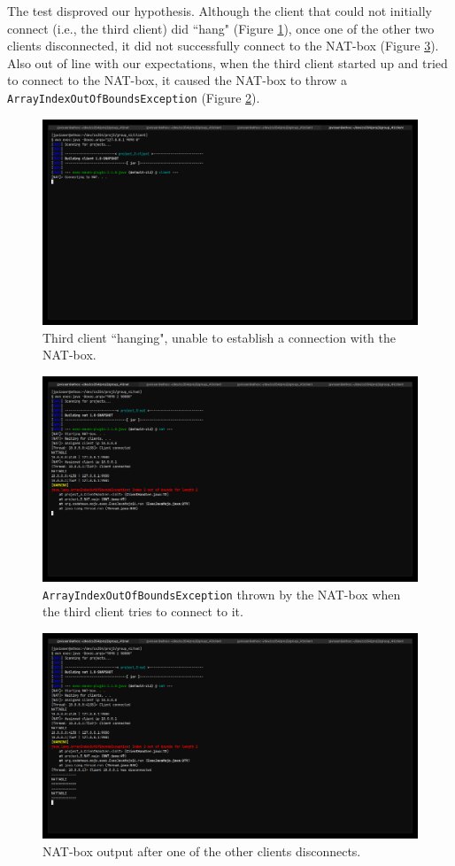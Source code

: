 \documentclass[10pt, a4paper]{article}
\begin{document}
The test disproved our hypothesis. Although the client that could not initially
connect (i.e., the third client) did ``hang" (Figure \ref{fig:exp2-1}), once one
of the other two clients disconnected, it did not successfully connect to the
NAT-box (Figure \ref{fig:exp2-3}). Also out of line with our expectations, when
the third client started up and tried to connect to the NAT-box, it caused the
NAT-box to throw a \texttt{ArrayIndexOutOfBoundsException} (Figure
\ref{fig:exp2-2}).

\begin{figure}
  \centering
  \includegraphics[width=12cm]{exp2-1}
  \caption{Third client ``hanging", unable to establish a connection with the
  NAT-box.}
  \label{fig:exp2-1}
\end{figure}

\begin{figure}
  \centering
  \includegraphics[width=12cm]{exp2-2}
  \caption{\texttt{ArrayIndexOutOfBoundsException} thrown by the NAT-box when
  the third client tries to connect to it.}
  \label{fig:exp2-2}
\end{figure}

\begin{figure}
  \centering
  \includegraphics[width=12cm]{exp2-3}
  \caption{NAT-box output after one of the other clients disconnects.}
  \label{fig:exp2-3}
\end{figure}
\end{document}
